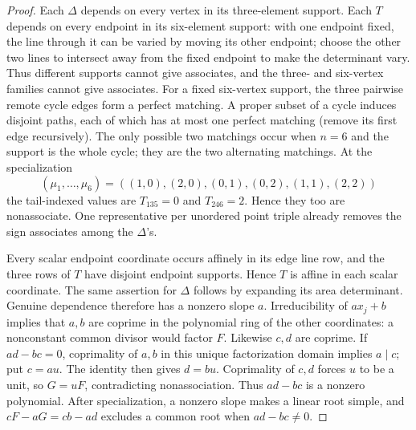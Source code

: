 \begin{proof}
Each $\Delta$ depends on every vertex in its three-element support. Each
$T$ depends on every endpoint in its six-element support: with one endpoint
fixed, the line through it can be varied by moving its other endpoint;
choose the other two lines to intersect away from the fixed endpoint to
make the determinant vary. Thus different supports cannot give associates,
and the three- and six-vertex families cannot give associates. For a fixed
six-vertex support, the three pairwise remote cycle edges form a perfect
matching. A proper subset of a cycle induces disjoint paths, each of which
has at most one perfect matching (remove its first edge recursively).
The only possible two matchings occur when $n=6$ and the support is the
whole cycle; they are the two alternating matchings. At the specialization
\begin{equation}\label{transport:T-n6-witness}
 (\mu_1,\ldots,\mu_6)=((1,0),(2,0),(0,1),(0,2),(1,1),(2,2))
\end{equation}
the tail-indexed values are $T_{135}=0$ and $T_{246}=2$. Hence they too are
nonassociate. One representative per unordered point triple already removes
the sign associates among the $\Delta$'s.

Every scalar endpoint coordinate occurs affinely in its edge line row, and
the three rows of $T$ have disjoint endpoint supports. Hence $T$ is affine
in each scalar coordinate. The same assertion for $\Delta$ follows by
expanding its area determinant. Genuine dependence therefore has a nonzero
slope $a$. Irreducibility of $a x_j+b$ implies that $a,b$ are coprime in
the polynomial ring of the other coordinates: a nonconstant common divisor
would factor $F$. Likewise $c,d$ are coprime. If $ad-bc=0$, coprimality
of $a,b$ in this unique factorization domain implies $a\mid c$; put $c=au$.
The identity then gives $d=bu$. Coprimality of $c,d$ forces $u$ to be a unit,
so $G=uF$, contradicting nonassociation. Thus $ad-bc$ is a nonzero polynomial.
After specialization, a nonzero slope makes a linear root simple, and
$cF-aG=cb-ad$ excludes a common root when $ad-bc\ne0$.
\end{proof}

